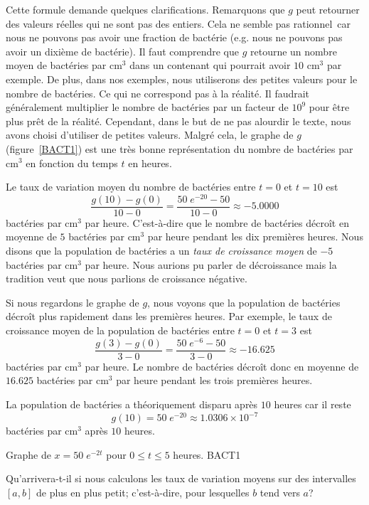 {\begin{egg}
Cette formule demande quelques clarifications.  Remarquons que $g$
peut retourner des valeurs réelles qui ne sont pas des entiers.  Cela
ne semble pas \lgm rationnel\rgm\ car nous ne pouvons pas avoir une
fraction de bactérie (e.g. nous ne pouvons pas avoir un dixième de
bactérie).  Il faut comprendre que $g$ retourne un nombre moyen de
bactéries par cm$^3$ dans un contenant qui pourrait avoir $10$ cm$^3$
par exemple.  De plus, dans nos exemples, nous utiliserons des petites
valeurs pour le nombre de bactéries.  Ce qui ne correspond pas à la
réalité.  Il faudrait généralement multiplier le nombre de bactéries
par un facteur de $10^9$ pour être plus prêt de la réalité.
Cependant, dans le but de ne pas alourdir le texte, nous avons choisi
d'utiliser de petites valeurs.  Malgré cela, le graphe de $g$
(figure~\ref{BACT1}) est une très bonne représentation du nombre
de bactéries par cm$^3$ en fonction du temps $t$ en heures.

Le taux de variation moyen du nombre de bactéries entre $t=0$ et
$t=10$ est
\[
\frac{g(10)-g(0)}{10 -0}
= \frac{50 \;e^{-20} - 50}{10 -0}
\approx -5.0000 
\]
bactéries par cm$^3$ par heure.  C'est-à-dire que le nombre de
bactéries décroît en moyenne de $5$ bactéries par cm$^3$ par heure
pendant les dix premières heures.  Nous disons que la population de
bactéries a un {\em taux de croissance moyen} de $-5$ bactéries par
cm$^3$ par heure.  Nous aurions pu parler de décroissance mais la
tradition veut que nous parlions de croissance négative.

Si nous regardons le graphe de $g$, nous voyons que la population de
bactéries décroît plus rapidement dans les premières heures.  Par
exemple, le taux de croissance moyen de la population de bactéries
entre $t=0$ et $t=3$ est
\[
\frac{g(3)-g(0)}{3 -0}
= \frac{50 \;e^{-6} - 50}{3 -0}
\approx -16.625
\]
bactéries par cm$^3$ par heure.  Le nombre de bactéries décroît
donc en moyenne de $16.625$ bactéries par cm$^3$ par heure pendant les
trois premières heures.

La population de bactéries a théoriquement disparu après $10$ heures
car il reste
\[
g(10) = 50 \;e^{-20} \approx  1.0306 \times 10^{-7}
\]
bactéries par cm$^3$ après $10$ heures.
\label{bacter0}
\end{egg}

{Graphe de $x= 50 \; e^{-2t}$ pour $ 0 \leq t \leq 5$ heures.}
{BACT1}

Qu'arrivera-t-il si nous calculons les taux de variation moyens sur des
intervalles $[a,b]$ de plus en plus petit; c'est-à-dire, pour
lesquelles $b$ tend vers $a$?

}
